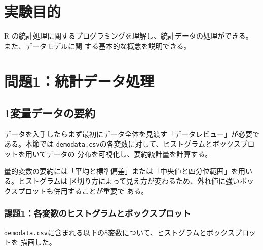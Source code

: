 \documentclass[12pt,a4paper]{ltjsarticle}
\begin{document}
\newpage
\thispagestyle{frontmatter}
\tableofcontents

\newpage
{}
\setcounter{page}{1}


\section{実験目的}\label{sec:objective}
R の統計処理に関するプログラミングを理解し、統計データの処理ができる。また、データモデルに関
する基本的な概念を説明できる。

\section{問題1：統計データ処理}\label{sec:problem1}

\subsection{1変量データの要約}\label{sec:univariate}

データを入手したらまず最初にデータ全体を見渡す「データレビュー」が必要である。本節では
\texttt{demodata.csv}の各変数に対して、ヒストグラムとボックスプロットを用いてデータの
分布を可視化し、要約統計量を計算する。

量的変数の要約には「平均と標準偏差」または「中央値と四分位範囲」を用いる。ヒストグラムは
区切り方によって見え方が変わるため、外れ値に強いボックスプロットも併用することが重要で
ある。

\subsubsection{課題1：各変数のヒストグラムとボックスプロット}\label{sec:univariate-task1}

\texttt{demodata.csv}に含まれる以下の8変数について、ヒストグラムとボックスプロットを
描画した。


\end{document}
